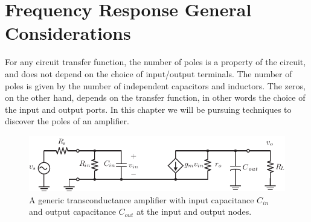 \section{Frequency Response General Considerations}
For any circuit transfer function, the number of poles is a property of the circuit, and does not depend on the choice of input/output terminals.  The number of poles is given by the number of independent capacitors and inductors.  The zeros, on the other hand, depends on the transfer function, in other words the choice of the input and output ports.  In this chapter we will be pursuing techniques to discover the poles of an amplifier.  
\begin{figure}[tb]
\begin{center}
\includegraphics[scale=1]{amp_two_poles}
\end{center}
\caption{A generic transconductance amplifier with input capacitance $C_{in}$ and output capacitance $C_{out}$ at the input and output nodes.}
\label{fig:amp_two_poles_indep}
\end{figure}

